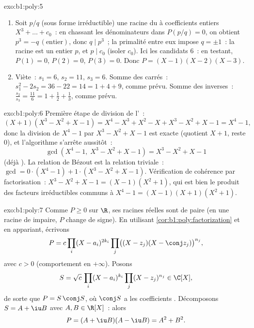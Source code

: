 \begin{solution}{exo:b1:poly:5}
\begin{enumerate}
  \item Soit $p/q$ (sous forme irréductible) une racine du  à coefficients entiers $X^3 + \dots + c_0$~: en
        chassant les dénominateurs dans $P(p/q) = 0$, on obtient $p^3
        = -q\,(\text{entier})$, donc $q \mid p^3$~; la primalité entre
        eux impose $q = \pm 1$~: la racine est un entier $p$, et $p
        \mid c_0$ (isoler $c_0$). Ici les candidats  $6$~: en
        testant, $P(1) = 0$, $P(2) = 0$, $P(3) = 0$. Donc $P =
        (X-1)(X-2)(X-3)$.
  \item Viète~: $s_1 = 6$, $s_2 = 11$, $s_3 = 6$. Somme des carrés~:
        $s_1^2 - 2s_2 = 36 - 22 = 14 = 1 + 4 + 9$, comme prévu. Somme
        des inverses~: $\frac{s_2}{s_3} = \frac{11}{6} = 1 + \frac12 +
        \frac13$, comme prévu.
\end{enumerate}
\end{solution}

\begin{solution}{exo:b1:poly:6}
Première étape de division de l'~:
\[
(X + 1)(X^3 - X^2 + X - 1)
= X^4 - X^3 + X^2 - X + X^3 - X^2 + X - 1 = X^4 - 1 ,
\]
donc la division de $X^4 - 1$ par $X^3 - X^2 + X - 1$ est exacte
(quotient $X + 1$, reste $0$), et l'algorithme s'arrête aussitôt~:
\[
\gcd(X^4 - 1,\; X^3 - X^2 + X - 1) = X^3 - X^2 + X - 1
\]
(déjà ). La relation de Bézout est la relation triviale~:
$\gcd = 0 \cdot (X^4 - 1) + 1 \cdot (X^3 - X^2 + X - 1)$. Vérification
de cohérence par factorisation~: $X^3 - X^2 + X - 1 = (X - 1)(X^2 +
1)$, qui est bien le produit des facteurs irréductibles communs à $X^4
- 1 = (X-1)(X+1)(X^2+1)$.
\end{solution}

\begin{solution}{exo:b1:poly:7}
Comme $P \geq 0$ sur $\R$, ses racines réelles sont de 
paire (en une racine de  impaire, $P$ change de signe). En
utilisant \cref{cor:b1:poly:factorization} et en appariant, écrivons
\[
P = c \prod_i (X - a_i)^{2k_i} \prod_j \bigl((X - z_j)(X - \conj
z_j)\bigr)^{n_j},
\]
avec $c > 0$ (comportement en $+\infty$). Posons
\[
S = \sqrt c\, \prod_i (X - a_i)^{k_i} \prod_j (X - z_j)^{n_j}
\in \C[X],
\]
de sorte que $P = S\,\conj S$, où $\conj S$ a les coefficients
. Décomposons $S = A + \iu B$ avec $A, B \in \R[X]$~: alors
\[
P = (A + \iu B)(A - \iu B) = A^2 + B^2 .
\]
\end{solution}

